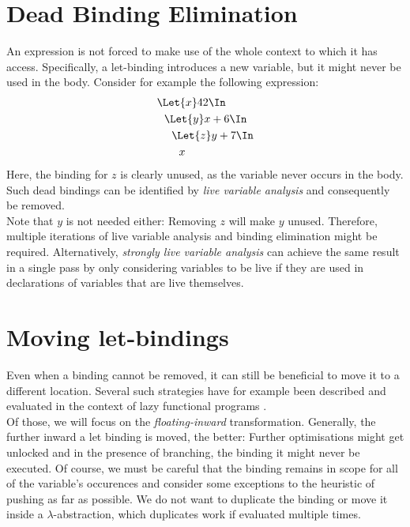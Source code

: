 \section{Dead Binding Elimination}
\label{sec:program-transformations-dbe}
An expression is not forced to make use of the whole context to which it has access.
Specifically, a let-binding introduces a new variable, but it might never be used
in the body.
Consider for example the following expression:
\begin{align*}
  &\Let{x} 42 \In            \\
  &\ \ \Let{y} x + 6 \In     \\
  &\ \ \ \ \Let{z} y + 7 \In \\
  &\ \ \ \ \ \ x
\end{align*}
Here, the binding for $z$ is clearly unused, as the variable never occurs in the body.
Such dead bindings can be identified by \emph{live variable analysis}
and consequently be removed.
\\
Note that $y$ is not needed either: Removing $z$ will make $y$ unused.
Therefore, multiple iterations of live variable analysis and binding elimination might be required.
Alternatively, \emph{strongly live variable analysis} can achieve the same result in a single pass
by only considering variables to be live
if they are used in declarations of variables that are live themselves.


\section{Moving let-bindings}
\label{sec:program-transformations-let-floating}
Even when a binding cannot be removed,
it can still be beneficial to move it to a different location.
Several such strategies have for example been described and evaluated
in the context of lazy functional programs
\cite{Jones1996LetFloating}.
\\
Of those, we will focus on the \emph{floating-inward} transformation.
Generally, the further inward a let binding is moved, the better:
Further optimisations might get unlocked and in the presence of branching,
the binding it might never be executed.
Of course, we must be careful that the binding remains in scope
for all of the variable's occurences
and consider some exceptions to the heuristic of pushing as far as possible.
We do not want to duplicate the binding
or move it inside a $\lambda$-abstraction, which duplicates work
if evaluated multiple times.

\vspace{1cm}
